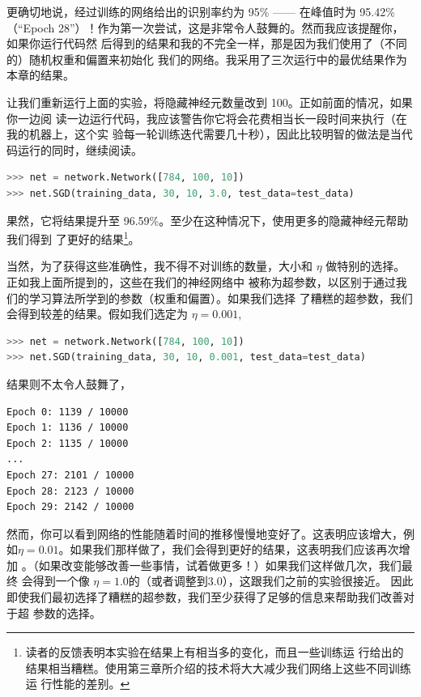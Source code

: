 更确切地说，经过训练的网络给出的识别率约为 95\% —— 在峰值时为 95.42\%（“Epoch
  28”）！作为第一次尝试，这是非常令人鼓舞的。然而我应该提醒你，如果你运行代码然
后得到的结果和我的不完全一样，那是因为我们使用了（不同的）随机权重和偏置来初始化
我们的网络。我采用了三次运行中的最优结果作为本章的结果。

让我们重新运行上面的实验，将隐藏神经元数量改到 100。正如前面的情况，如果你一边阅
读一边运行代码，我应该警告你它将会花费相当长一段时间来执行（在我的机器上，这个实
  验每一轮训练迭代需要几十秒），因此比较明智的做法是当代码运行的同时，继续阅读。

\begin{lstlisting}[language=Python]
>>> net = network.Network([784, 100, 10])
>>> net.SGD(training_data, 30, 10, 3.0, test_data=test_data)
\end{lstlisting}

果然，它将结果提升至 96.59\%。至少在这种情况下，使用更多的隐藏神经元帮助我们得到
了更好的结果\footnote{读者的反馈表明本实验在结果上有相当多的变化，而且一些训练运
  行给出的结果相当糟糕。使用第三章所介绍的技术将大大减少我们网络上这些不同训练运
  行性能的差别。}。

当然，为了获得这些准确性，我不得不对训练的\epochs{}数量，\minibatch{}大小和%
\learningrate{} $\eta$ 做特别的选择。正如我上面所提到的，这些在我们的神经网络中
被称为超参数，以区别于通过我们的学习算法所学到的参数（权重和偏置）。如果我们选择
了糟糕的超参数，我们会得到较差的结果。假如我们选定\learningrate{}为 $\eta =
0.001$,

\begin{lstlisting}[language=Python]
>>> net = network.Network([784, 100, 10])
>>> net.SGD(training_data, 30, 10, 0.001, test_data=test_data)
\end{lstlisting}

结果则不太令人鼓舞了，

\begin{lstlisting}[language=sh]
Epoch 0: 1139 / 10000
Epoch 1: 1136 / 10000
Epoch 2: 1135 / 10000
...
Epoch 27: 2101 / 10000
Epoch 28: 2123 / 10000
Epoch 29: 2142 / 10000
\end{lstlisting}

然而，你可以看到网络的性能随着时间的推移慢慢地变好了。这表明应该增大\learningrate{}，例
如$\eta = 0.01$。如果我们那样做了，我们会得到更好的结果，这表明我们应该再次增加
\learningrate{}。（如果改变能够改善一些事情，试着做更多！）如果我们这样做几次，我们最终
会得到一个像 $\eta = 1.0$的\learningrate{}（或者调整到$3.0$），这跟我们之前的实验很接近。
因此即使我们最初选择了糟糕的超参数，我们至少获得了足够的信息来帮助我们改善对于超
参数的选择。

